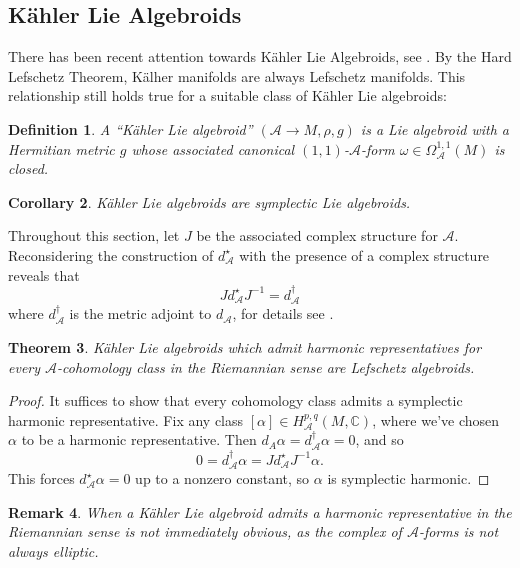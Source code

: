 \documentclass{amsart}
\newcommand{\C}{\mathbb{C}}
\newcommand{\ra}{\rightarrow}
\newtheorem{theorem}{Theorem}
\newtheorem{corollary}[theorem]{Corollary}
\newtheorem{definition}[theorem]{Definition}
\newtheorem{remark}[theorem]{Remark}
\newcommand{\A}{\mathcal{A}}
\theoremstyle{definition}
\begin{document}
\subsection{K\"ahler Lie Algebroids}
There has been recent attention towards K\"ahler Lie Algebroids, see \cite{hu2024kodairavanishingtheoremskahler}. By the Hard Lefschetz Theorem, K\"alher manifolds are always Lefschetz manifolds. This relationship still holds true for a suitable class of K\"ahler Lie algebroids:
\begin{definition}
    A ``K\"ahler Lie algebroid'' $(\A \ra M, \rho,g)$ is a Lie algebroid with a Hermitian metric $g$ whose associated canonical $(1,1)$-$\A$-form $\omega \in \Omega_\A^{1,1}(M)$ is closed.
\end{definition}
\begin{corollary}
    K\"ahler Lie algebroids are symplectic Lie algebroids.
\end{corollary}
Throughout this section, let $J$ be the associated complex structure for $\A$. Reconsidering the construction of $d_\A^\star$ with the presence of a complex structure reveals that
\begin{equation*}
    J d_\A^\star J^{-1} = d_\A^\dagger 
\end{equation*}
where $d_\A^\dagger$ is the metric adjoint to $d_\A$, for details see \cite{Shlomonotes}.
\begin{theorem}
    K\"ahler Lie algebroids which admit harmonic representatives for every $\A$-cohomology class in the Riemannian sense are Lefschetz algebroids.
\end{theorem}
\begin{proof}
    It suffices to show that every cohomology class admits a symplectic harmonic representative. Fix any class $[\alpha] \in H_\A^{p,q}(M,\C)$, where we've chosen $\alpha$ to be a harmonic representative. Then $d_A \alpha=d_\A^\dagger \alpha =0$, and so
    \begin{equation*}
       0= d_\A^\dagger \alpha = Jd_\A^\star J^{-1}\alpha.
    \end{equation*}
    This forces $d_\A^\star \alpha =0$ up to a nonzero constant, so $\alpha$ is symplectic harmonic.
\end{proof}
\begin{remark}
    When a Kähler Lie algebroid admits a harmonic representative in the Riemannian sense is not immediately obvious, as the complex of $\A$-forms is not always elliptic.
\end{remark}



\printbibliography
\end{document}
